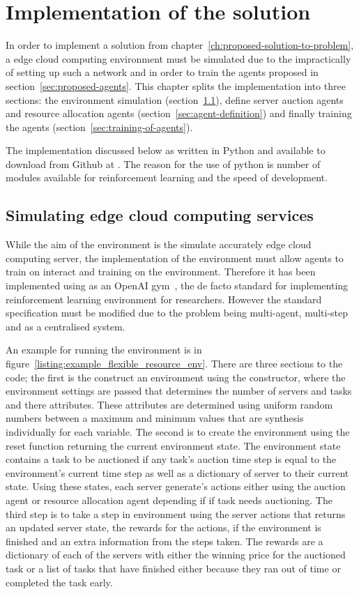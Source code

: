 \chapter{Implementation of the solution}\label{ch:implementation-of-the-solution}
In order to implement a solution from chapter~\ref{ch:proposed-solution-to-problem}, a edge cloud computing environment
must be simulated due to the impractically of setting up such a network and in order to train the agents proposed
in section~\ref{sec:proposed-agents}. This chapter splits the implementation into three sections: the environment
simulation (section~\ref{sec:simulating-edge-cloud-computing-services}), define server auction agents and resource
allocation agents (section~\ref{sec:agent-definition}) and finally training the agents
(section~\ref{sec:training-of-agents}).

The implementation discussed below as written in Python and available to download from Github at
. The reason for the use of python is number
of modules available for reinforcement learning and the speed of development.

\section{Simulating edge cloud computing services}\label{sec:simulating-edge-cloud-computing-services}
While the aim of the environment is the simulate accurately edge cloud computing server, the implementation of the
environment must allow agents to train on interact and training on the environment. Therefore it has been implemented
using as an OpenAI gym~\citep{openaigym}, the de facto standard for implementing reinforcement learning
environment for researchers. However the standard specification must be modified due to the problem being multi-agent,
multi-step and as a centralised system.

An example for running the environment is in figure~\ref{listing:example_flexible_resource_env}. There are three
sections to the code; the first is the construct an environment using the constructor, where the environment settings
are passed that determines the number of servers and tasks and there attributes. These attributes are determined using
uniform random numbers between a maximum and minimum values that are synthesis individually for each variable. The
second is to create the environment using the reset function returning the current environment state. The environment
state contains a task to be auctioned if any task's auction time step is equal to the environment's current time step
as well as a dictionary of server to their current state. Using these states, each server generate's actions either
using the auction agent or resource allocation agent depending if if task needs auctioning. The third step is to
take a step in environment using the server actions that returns an updated server state, the rewards for the actions,
if the environment is finished and an extra information from the steps taken. The rewards are a dictionary of each of
the servers with either the winning price for the auctioned task or a list of tasks that have finished either because
they ran out of time or completed the task early.

